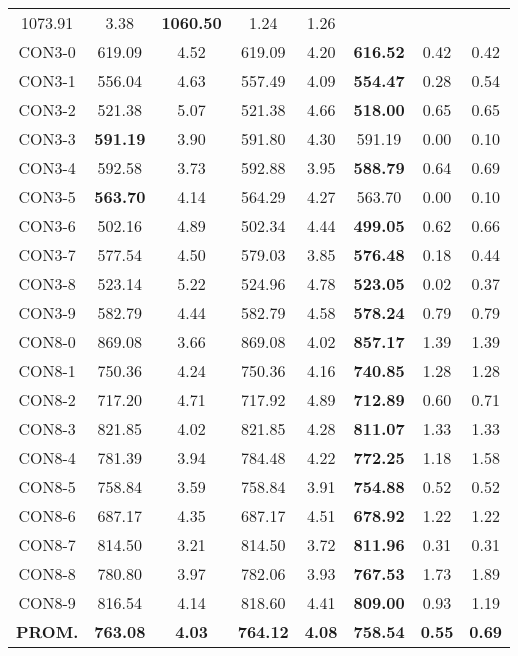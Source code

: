 \begin{table}[ht]
\begin{tabular}{c c c c c c c c}
1073.91 & 3.38 & \bf{1060.50} & 
1.24 & 1.26\\CON3-0 & 619.09 & 4.52 & 
619.09 & 4.20 & \bf{616.52} & 
0.42 & 0.42\\CON3-1 & 556.04 & 4.63 & 
557.49 & 4.09 & \bf{554.47} & 
0.28 & 0.54\\CON3-2 & 521.38 & 5.07 & 
521.38 & 4.66 & \bf{518.00} & 
0.65 & 0.65\\CON3-3 & \bf{591.19} & 3.90 & 
591.80 & 4.30 & 591.19 & 0.00
 & 0.10\\CON3-4 & 592.58 & 3.73 & 
592.88 & 3.95 & \bf{588.79} & 
0.64 & 0.69\\CON3-5 & \bf{563.70} & 4.14 & 
564.29 & 4.27 & 563.70 & 0.00
 & 0.10\\CON3-6 & 502.16 & 4.89 & 
502.34 & 4.44 & \bf{499.05} & 
0.62 & 0.66\\CON3-7 & 577.54 & 4.50 & 
579.03 & 3.85 & \bf{576.48} & 
0.18 & 0.44\\CON3-8 & 523.14 & 5.22 & 
524.96 & 4.78 & \bf{523.05} & 
0.02 & 0.37\\CON3-9 & 582.79 & 4.44 & 
582.79 & 4.58 & \bf{578.24} & 
0.79 & 0.79\\CON8-0 & 869.08 & 3.66 & 
869.08 & 4.02 & \bf{857.17} & 
1.39 & 1.39\\CON8-1 & 750.36 & 4.24 & 
750.36 & 4.16 & \bf{740.85} & 
1.28 & 1.28\\CON8-2 & 717.20 & 4.71 & 
717.92 & 4.89 & \bf{712.89} & 
0.60 & 0.71\\CON8-3 & 821.85 & 4.02 & 
821.85 & 4.28 & \bf{811.07} & 
1.33 & 1.33\\CON8-4 & 781.39 & 3.94 & 
784.48 & 4.22 & \bf{772.25} & 
1.18 & 1.58\\CON8-5 & 758.84 & 3.59 & 
758.84 & 3.91 & \bf{754.88} & 
0.52 & 0.52\\CON8-6 & 687.17 & 4.35 & 
687.17 & 4.51 & \bf{678.92} & 
1.22 & 1.22\\CON8-7 & 814.50 & 3.21 & 
814.50 & 3.72 & \bf{811.96} & 
0.31 & 0.31\\CON8-8 & 780.80 & 3.97 & 
782.06 & 3.93 & \bf{767.53} & 
1.73 & 1.89\\CON8-9 & 816.54 & 4.14 & 
818.60 & 4.41 & \bf{809.00} & 
0.93 & 1.19\\\bf{PROM.} & 
\bf{763.08} & \bf{4.03} & \bf{764.12} & \bf{4.08} & \bf{758.54} & \bf{0.55} & \bf{0.69}\\[1ex]\hline
\end{tabular}
\label{table:nonlin}
\end{table} \clearpage

